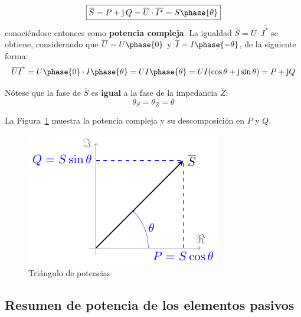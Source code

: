 \begin{itemize}
\begin{equation}
            \boxed{\overline{S}=P+\mathrm{j}\,Q=\overline{U}\cdot \overline{I^*}=S\phase{\theta}}
          \end{equation}
          conociéndose entonces como \textbf{potencia compleja}. La
          igualdad $\overline{S}=\overline{U}\cdot \overline{I^*}$ se
          obtiene, considerando que $\overline{U} = U\phase{0}$ y
          $\overline{I} = I\phase{-\theta}$, de la siguiente forma:
          \begin{equation*}
            \overline{U} \overline{I}^* = U\phase{0} \cdot I\phase{\theta} = UI\phase{\theta}= U I (\cos\theta + \mathrm{j} \sin\theta) = P + \mathrm{j} Q
          \end{equation*}
          \begin{remark}
            Nótese que la fase de $\overline{S}$ es \textbf{igual} a
            la fase de la impedancia $\overline{Z}$:
            \begin{equation*}
              \theta_S = \theta_Z = \theta
            \end{equation*}
          \end{remark}
          La Figura~\ref{fig.trianguloPotencias} muestra la potencia
          compleja y su descomposición en $P$ y $Q$.
          \begin{figure}[H]
            \centering
            \includegraphics{../figs/trianguloPotencias.pdf}
            \caption{Triángulo de potencias}
            \label{fig.trianguloPotencias}
          \end{figure}
	\end{itemize}
	
	
        \subsection{Resumen de potencia de los elementos pasivos}
	
